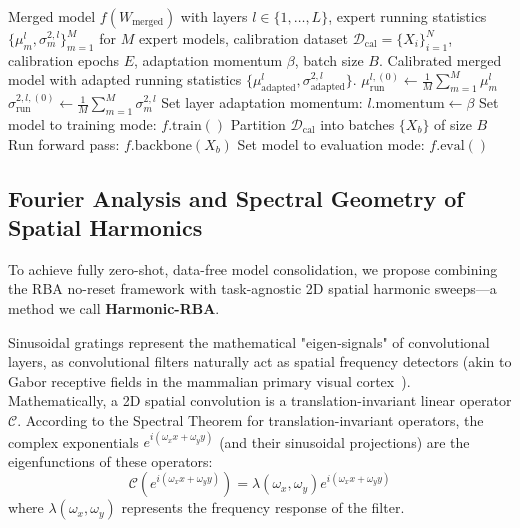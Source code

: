 \documentclass{article}
\begin{document}
\begin{algorithm}[tb]
   \caption{Regularized BatchNorm Adaptation (RBA)}
   \label{alg:rba}
\begin{algorithmic}[1]
    Merged model $f(W_{\text{merged}})$ with layers $l \in \{1, \dots, L\}$, expert running statistics $\{\mu^l_m, \sigma^{2,l}_m\}_{m=1}^M$ for $M$ expert models, calibration dataset $\mathcal{D}_{\text{cal}} = \{X_i\}_{i=1}^N$, calibration epochs $E$, adaptation momentum $\beta$, batch size $B$.
    Calibrated merged model with adapted running statistics $\{\mu^l_{\text{adapted}}, \sigma^{2,l}_{\text{adapted}}\}$.
   \STATE
   \STATE {}
       \STATE $\mu_{\text{run}}^{l,(0)} \leftarrow \frac{1}{M} \sum_{m=1}^M \mu^l_m$
       \STATE $\sigma^{2,l,(0)}_{\text{run}} \leftarrow \frac{1}{M} \sum_{m=1}^M \sigma^{2,l}_m$
       \STATE Set layer adaptation momentum: $l.\text{momentum} \leftarrow \beta$
     \ENDIF
   \ENDFOR
   \STATE
   \STATE {}
   \STATE Set model to training mode: $f.\text{train}()$
     \STATE Partition $\mathcal{D}_{\text{cal}}$ into batches $\{X_b\}$ of size $B$
       \STATE {}
       \STATE Run forward pass: $f.\text{backbone}(X_b)$
     \ENDFOR
   \ENDFOR
   \STATE
   \STATE {}
   \STATE Set model to evaluation mode: $f.\text{eval}()$
\end{algorithmic}
\end{algorithm}

\subsection{Fourier Analysis and Spectral Geometry of Spatial Harmonics}
To achieve fully zero-shot, data-free model consolidation, we propose combining the RBA no-reset framework with task-agnostic 2D spatial harmonic sweeps—a method we call \textbf{Harmonic-RBA}.

Sinusoidal gratings represent the mathematical "eigen-signals" of convolutional layers, as convolutional filters naturally act as spatial frequency detectors (akin to Gabor receptive fields in the mammalian primary visual cortex~\cite{he2016deep}). Mathematically, a 2D spatial convolution is a translation-invariant linear operator $\mathcal{C}$. According to the Spectral Theorem for translation-invariant operators, the complex exponentials $e^{i(\omega_x x + \omega_y y)}$ (and their sinusoidal projections) are the eigenfunctions of these operators:
\begin{equation}
  \mathcal{C} \left( e^{i(\omega_x x + \omega_y y)} \right) = \lambda(\omega_x, \omega_y) e^{i(\omega_x x + \omega_y y)}
\end{equation}
where $\lambda(\omega_x, \omega_y)$ represents the frequency response of the filter.
\end{document}
